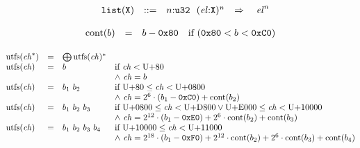 \vspace{1ex}

$$
\begin{array}[t]{@{}lrrl@{}l@{}l@{}l@{}}
& {\mathtt{list}}({\mathtt{X}}) & ::= & n{:}{\mathtt{u32}}~~{({\mathit{el}}{:}{\mathtt{X}})^{n}} & \quad\Rightarrow\quad{} & {{\mathit{el}}^{n}} \\
\end{array}
$$

\vspace{1ex}

$$
\begin{array}[t]{@{}lcl@{}l@{}}
{\mathrm{cont}}(b) & = & b - \mathtt{0x80} & \quad \mbox{if}~ (\mathtt{0x80} < b < \mathtt{0xC0}) \\
\end{array}
$$

$$
\begin{array}[t]{@{}lcl@{}l@{}}
{\mathrm{utf{\kern-0.1em\scriptstyle 8}}}({{\mathit{ch}}^\ast}) & = & {\bigoplus}\, {{\mathrm{utf{\kern-0.1em\scriptstyle 8}}}({\mathit{ch}})^\ast} \\
{\mathrm{utf{\kern-0.1em\scriptstyle 8}}}({\mathit{ch}}) & = & b & \quad
\begin{array}[t]{@{}l@{}}
\mbox{if}~ {\mathit{ch}} < \mathrm{U{+}80} \\
{\land}~ {\mathit{ch}} = b \\
\end{array} \\
{\mathrm{utf{\kern-0.1em\scriptstyle 8}}}({\mathit{ch}}) & = & b_1~b_2 & \quad
\begin{array}[t]{@{}l@{}}
\mbox{if}~ \mathrm{U{+}80} \leq {\mathit{ch}} < \mathrm{U{+}0800} \\
{\land}~ {\mathit{ch}} = {2^{6}} \cdot (b_1 - \mathtt{0xC0}) + {\mathrm{cont}}(b_2) \\
\end{array} \\
{\mathrm{utf{\kern-0.1em\scriptstyle 8}}}({\mathit{ch}}) & = & b_1~b_2~b_3 & \quad
\begin{array}[t]{@{}l@{}}
\mbox{if}~ \mathrm{U{+}0800} \leq {\mathit{ch}} < \mathrm{U{+}D800} \lor \mathrm{U{+}E000} \leq {\mathit{ch}} < \mathrm{U{+}10000} \\
{\land}~ {\mathit{ch}} = {2^{12}} \cdot (b_1 - \mathtt{0xE0}) + {2^{6}} \cdot {\mathrm{cont}}(b_2) + {\mathrm{cont}}(b_3) \\
\end{array} \\
{\mathrm{utf{\kern-0.1em\scriptstyle 8}}}({\mathit{ch}}) & = & b_1~b_2~b_3~b_4 & \quad
\begin{array}[t]{@{}l@{}}
\mbox{if}~ \mathrm{U{+}10000} \leq {\mathit{ch}} < \mathrm{U{+}11000} \\
{\land}~ {\mathit{ch}} = {2^{18}} \cdot (b_1 - \mathtt{0xF0}) + {2^{12}} \cdot {\mathrm{cont}}(b_2) + {2^{6}} \cdot {\mathrm{cont}}(b_3) + {\mathrm{cont}}(b_4) \\
\end{array} \\
\end{array}
$$

